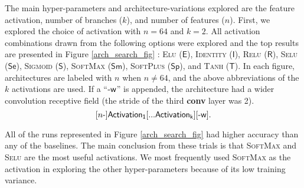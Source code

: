The main hyper-parameters and architecture-variations explored are the
feature activation, number of branches ($k$), and number of features
($n$).  First, we explored the choice of activation with $n=64$ and
$k=2$.  All activation combinations drawn from the following options
were explored and the top results are presented in Figure
\ref{arch_search_fig} : \textsc{Elu} ($\mathsf{E}$), \textsc{Identity} ($\mathsf{I}$), \textsc{Relu} ($\mathsf{R}$), \textsc{Selu} ($\mathsf{Se}$),
\textsc{Sigmoid} ($\mathsf{S}$), \textsc{SoftMax} ($\mathsf{Sm}$), \textsc{SoftPlus} ($\mathsf{Sp}$), and \textsc{Tanh} ($\mathsf{T}$).
In each figure, architectures are labeled with $n$ when $n\neq64$, and the
above abbreviations of the $k$ activations are used.  If a ``$\mathop{\mbox{-$\mathsf{w}$}}$'' is appended,
the architecture had a wider convolution receptive field (the stride of the
third \textbf{conv} layer was 2).
\begin{equation} \label{archnotation_sup:1}
\mathsf{[\mathop{\mbox{$n$-}}] Activation_1 [... Activation_k]}[\mathop{\mbox{-$\mathsf{w}$}}].
\end{equation}

All of the runs represented in Figure \ref{arch_search_fig} had
higher accuracy than any of the baselines.  The main conclusion from
these trials is that \textsc{SoftMax} and \textsc{Selu} are the most useful
activations.  We most frequently used \textsc{SoftMax} as the activation in
exploring the other hyper-parameters because of its low training
variance.

